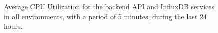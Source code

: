 \begin{figure}[!htbp]
    \centering
    \caption[AWS ECS Advanced Monitoring Example 2]{Average CPU Utilization for the backend API and InfluxDB services in all environments, with a period of 5 minutes, during the last 24 hours.}
    \label{fig:ecs-example-02}
\end{figure} 
    